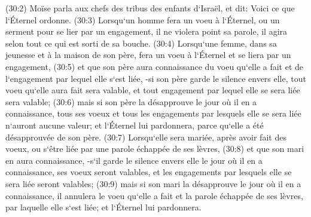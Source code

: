 \verse (30:2) Moïse parla aux chefs des tribus des enfants d`Israël, et dit: Voici ce que l`Éternel ordonne. 
\verse (30:3) Lorsqu`un homme fera un voeu à l`Éternel, ou un serment pour se lier par un engagement, il ne violera point sa parole, il agira selon tout ce qui est sorti de sa bouche. 
\verse (30:4) Lorsqu`une femme, dans sa jeunesse et à la maison de son père, fera un voeu à l`Éternel et se liera par un engagement, 
\verse (30:5) et que son père aura connaissance du voeu qu`elle a fait et de l`engagement par lequel elle s`est liée, -si son père garde le silence envers elle, tout voeu qu`elle aura fait sera valable, et tout engagement par lequel elle se sera liée sera valable; 
\verse (30:6) mais si son père la désapprouve le jour où il en a connaissance, tous ses voeux et tous les engagements par lesquels elle se sera liée n`auront aucune valeur; et l`Éternel lui pardonnera, parce qu`elle a été désapprouvée de son père. 
\verse (30:7) Lorsqu`elle sera mariée, après avoir fait des voeux, ou s`être liée par une parole échappée de ses lèvres, 
\verse (30:8) et que son mari en aura connaissance, -s`il garde le silence envers elle le jour où il en a connaissance, ses voeux seront valables, et les engagements par lesquels elle se sera liée seront valables; 
\verse (30:9) mais si son mari la désapprouve le jour où il en a connaissance, il annulera le voeu qu`elle a fait et la parole échappée de ses lèvres, par laquelle elle s`est liée; et l`Éternel lui pardonnera. 
